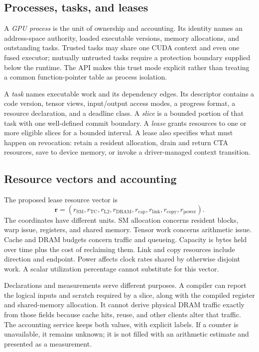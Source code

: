 \subsection{Processes, tasks, and leases}
A \emph{GPU process} is the unit of ownership and accounting. Its identity
names an address-space authority, loaded executable versions, memory
allocations, and outstanding tasks. Trusted tasks may share one CUDA context
and even one fused executor; mutually untrusted tasks require a protection
boundary supplied below the runtime. The API makes this trust mode explicit
rather than treating a common function-pointer table as process isolation.

A \emph{task} names executable work and its dependency edges. Its descriptor
contains a code version, tensor views, input/output access modes, a progress
format, a resource declaration, and a deadline class. A \emph{slice} is a
bounded portion of that task with one well-defined commit boundary. A
\emph{lease} grants resources to one or more eligible slices for a bounded
interval. A lease also specifies what must happen on revocation: retain a
resident allocation, drain and return CTA resources, save to device memory,
or invoke a driver-managed context transition.

\subsection{Resource vectors and accounting}
The proposed lease resource vector is
\begin{equation}
 \mathbf r=(r_{\mathrm{SM}},r_{\mathrm{TC}},r_{\mathrm{L2}},r_{\mathrm{DRAM}},
 r_{\mathrm{cap}},r_{\mathrm{link}},r_{\mathrm{copy}},r_{\mathrm{power}}).
\end{equation}
The coordinates have different units. SM allocation concerns resident
blocks, warp issue, registers, and shared memory. Tensor work concerns
arithmetic issue. Cache and DRAM budgets concern traffic and queueing.
Capacity is bytes held over time plus the cost of reclaiming them. Link and
copy resources include direction and endpoint. Power affects clock rates
shared by otherwise disjoint work. A scalar utilization percentage cannot
substitute for this vector.

Declarations and measurements serve different purposes. A compiler can
report the logical inputs and scratch required by a slice, along with the
compiled register and shared-memory allocation. It cannot derive physical
DRAM traffic exactly from those fields because cache hits, reuse, and other
clients alter that traffic. The accounting service keeps both values, with
explicit labels. If a counter is unavailable, it remains unknown; it is not
filled with an arithmetic estimate and presented as a measurement.

